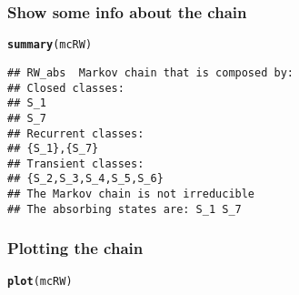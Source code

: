 \documentclass[aspectratio=169]{beamer}\usepackage[]{graphicx}\usepackage[]{xcolor}
\makeatletter
\newcommand{\hlnum}[1]{\textcolor[rgb]{0.686,0.059,0.569}{#1}}%
\newcommand{\hlsng}[1]{\textcolor[rgb]{0.192,0.494,0.8}{#1}}%
\newcommand{\hlopt}[1]{\textcolor[rgb]{0,0,0}{#1}}%
\newcommand{\hldef}[1]{\textcolor[rgb]{0.345,0.345,0.345}{#1}}%
\newcommand{\hlkwb}[1]{\textcolor[rgb]{0.69,0.353,0.396}{#1}}%
\newcommand{\hlkwc}[1]{\textcolor[rgb]{0.333,0.667,0.333}{#1}}%
\newcommand{\hlkwd}[1]{\textcolor[rgb]{0.737,0.353,0.396}{\textbf{#1}}}%
\newenvironment{kframe}{%
 \def\at@end@of@kframe{}%
 \ifinner\ifhmode%
  \def\at@end@of@kframe{\end{minipage}}%
  \begin{minipage}{\columnwidth}%
 \fi\fi%
 \def\FrameCommand##1{\hskip\@totalleftmargin \hskip-\fboxsep
 \colorbox{shadecolor}{##1}\hskip-\fboxsep
     \hskip-\linewidth \hskip-\@totalleftmargin \hskip\columnwidth}%
 \MakeFramed {\advance\hsize-\width
   \@totalleftmargin\z@ \linewidth\hsize
   \@setminipage}}%
 {\par\unskip\endMakeFramed%
 \at@end@of@kframe}
\newenvironment{knitrout}{}{} %
\makeatother
\begin{document}

\begin{frame}[fragile]\frametitle{Show some info about the chain}
\begin{knitrout}
\color{fgcolor}\begin{kframe}
\begin{alltt}
\hlkwd{summary}\hldef{(mcRW)}
\end{alltt}
\begin{verbatim}
## RW_abs  Markov chain that is composed by: 
## Closed classes: 
## S_1 
## S_7 
## Recurrent classes: 
## {S_1},{S_7}
## Transient classes: 
## {S_2,S_3,S_4,S_5,S_6}
## The Markov chain is not irreducible 
## The absorbing states are: S_1 S_7
\end{verbatim}
\end{kframe}
\end{knitrout}
\end{frame}

\begin{frame}[fragile]\frametitle{Plotting the chain}
\begin{knitrout}
\color{fgcolor}\begin{kframe}
\begin{alltt}
\hlkwd{plot}\hldef{(mcRW)}
\end{alltt}
\end{kframe}
\end{knitrout}
\end{frame}

\end{document}
